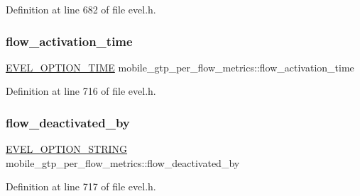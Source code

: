 Definition at line 682 of file evel.\+h.

\hypertarget{structmobile__gtp__per__flow__metrics_af54aacdd72dcd6b5d5b33745eadd3e06}{}\label{structmobile__gtp__per__flow__metrics_af54aacdd72dcd6b5d5b33745eadd3e06} 
\subsubsection{\texorpdfstring{flow\+\_\+activation\+\_\+time}{flow\_activation\_time}}
{\footnotesize\ttfamily \hyperlink{evel_8h_ae0ea81cde70a2a1b685aae7ae8e9d19b}{E\+V\+E\+L\+\_\+\+O\+P\+T\+I\+O\+N\+\_\+\+T\+I\+ME} mobile\+\_\+gtp\+\_\+per\+\_\+flow\+\_\+metrics\+::flow\+\_\+activation\+\_\+time}



Definition at line 716 of file evel.\+h.

\hypertarget{structmobile__gtp__per__flow__metrics_ac1bd98d1620e7640bc8c0d51ea7ef869}{}\label{structmobile__gtp__per__flow__metrics_ac1bd98d1620e7640bc8c0d51ea7ef869} 
\subsubsection{\texorpdfstring{flow\+\_\+deactivated\+\_\+by}{flow\_deactivated\_by}}
{\footnotesize\ttfamily \hyperlink{evel_8h_a0de5113a7b72de93c0c7b644f7ea7ec3}{E\+V\+E\+L\+\_\+\+O\+P\+T\+I\+O\+N\+\_\+\+S\+T\+R\+I\+NG} mobile\+\_\+gtp\+\_\+per\+\_\+flow\+\_\+metrics\+::flow\+\_\+deactivated\+\_\+by}



Definition at line 717 of file evel.\+h.

\hypertarget{structmobile__gtp__per__flow__metrics_a88653ac380668d8bb85da4a06e125e3d}{}\label{structmobile__gtp__per__flow__metrics_a88653ac380668d8bb85da4a06e125e3d} 
